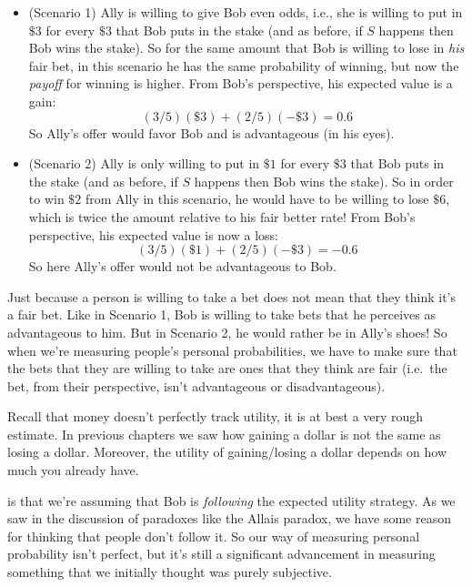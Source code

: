 \documentclass[]{tufte-book}
\begin{document}
\begin{itemize}
\item
  (Scenario 1) Ally is willing to give Bob even odds, i.e., she is willing to put in \(\$3\) for every \(\$3\) that Bob puts in the stake (and as before, if \(S\) happens then Bob wins the stake). So for the same amount that Bob is willing to lose in \emph{his} fair bet, in this scenario he has the same probability of winning, but now the \emph{payoff} for winning is higher. From Bob's perspective, his expected value is a gain: \[ (3/5)(\$3) + (2/5)(-\$3) = 0.6 \] So Ally's offer would favor Bob and is advantageous (in his eyes).
\item
  (Scenario 2) Ally is only willing to put in \(\$1\) for every \(\$3\) that Bob puts in the stake (and as before, if \(S\) happens then Bob wins the stake). So in order to win \(\$2\) from Ally in this scenario, he would have to be willing to lose \(\$6\), which is twice the amount relative to his fair better rate! From Bob's perspective, his expected value is now a loss: \[ (3/5)(\$1) + (2/5)(-\$3) = -0.6 \] So here Ally's offer would not be advantageous to Bob.
\end{itemize}

 Just because a person is willing to take a bet does not mean that they think it's a fair bet. Like in Scenario 1, Bob is willing to take bets that he perceives as advantageous to him. But in Scenario 2, he would rather be in Ally's shoes! So when we're measuring people's personal probabilities, we have to make sure that the bets that they are willing to take are ones that they think are fair (i.e.~the bet, from their perspective, isn't advantageous or disadvantageous).

 Recall that money doesn't perfectly track utility, it is at best a very rough estimate. In previous chapters we saw how gaining a dollar is not the same as losing a dollar. Moreover, the utility of gaining/losing a dollar depends on how much you already have.

 is that we're assuming that Bob is \emph{following} the expected utility strategy. As we saw in the discussion of paradoxes like the Allais paradox, we have some reason for thinking that people don't follow it. So our way of measuring personal probability isn't perfect, but it's still a significant advancement in measuring something that we initially thought was purely subjective.
\end{document}
